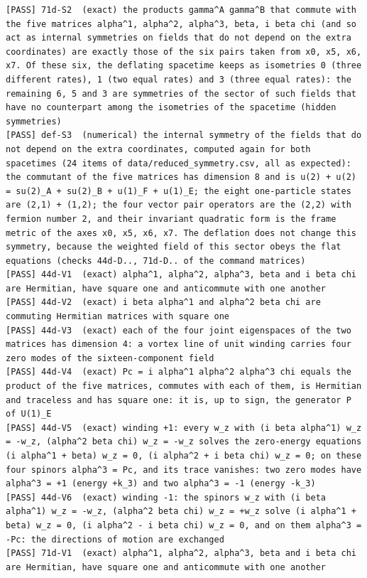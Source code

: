 \documentclass[
  10pt,
]{article}
\begin{document}
\begin{verbatim}
[PASS] 71d-S2  (exact) the products gamma^A gamma^B that commute with the five matrices alpha^1, alpha^2, alpha^3, beta, i beta chi (and so act as internal symmetries on fields that do not depend on the extra coordinates) are exactly those of the six pairs taken from x0, x5, x6, x7. Of these six, the deflating spacetime keeps as isometries 0 (three different rates), 1 (two equal rates) and 3 (three equal rates): the remaining 6, 5 and 3 are symmetries of the sector of such fields that have no counterpart among the isometries of the spacetime (hidden symmetries)
[PASS] def-S3  (numerical) the internal symmetry of the fields that do not depend on the extra coordinates, computed again for both spacetimes (24 items of data/reduced_symmetry.csv, all as expected): the commutant of the five matrices has dimension 8 and is u(2) + u(2) = su(2)_A + su(2)_B + u(1)_F + u(1)_E; the eight one-particle states are (2,1) + (1,2); the four vector pair operators are the (2,2) with fermion number 2, and their invariant quadratic form is the frame metric of the axes x0, x5, x6, x7. The deflation does not change this symmetry, because the weighted field of this sector obeys the flat equations (checks 44d-D.., 71d-D.. of the command matrices)
[PASS] 44d-V1  (exact) alpha^1, alpha^2, alpha^3, beta and i beta chi are Hermitian, have square one and anticommute with one another
[PASS] 44d-V2  (exact) i beta alpha^1 and alpha^2 beta chi are commuting Hermitian matrices with square one
[PASS] 44d-V3  (exact) each of the four joint eigenspaces of the two matrices has dimension 4: a vortex line of unit winding carries four zero modes of the sixteen-component field
[PASS] 44d-V4  (exact) Pc = i alpha^1 alpha^2 alpha^3 chi equals the product of the five matrices, commutes with each of them, is Hermitian and traceless and has square one: it is, up to sign, the generator P of U(1)_E
[PASS] 44d-V5  (exact) winding +1: every w_z with (i beta alpha^1) w_z = -w_z, (alpha^2 beta chi) w_z = -w_z solves the zero-energy equations (i alpha^1 + beta) w_z = 0, (i alpha^2 + i beta chi) w_z = 0; on these four spinors alpha^3 = Pc, and its trace vanishes: two zero modes have alpha^3 = +1 (energy +k_3) and two alpha^3 = -1 (energy -k_3)
[PASS] 44d-V6  (exact) winding -1: the spinors w_z with (i beta alpha^1) w_z = -w_z, (alpha^2 beta chi) w_z = +w_z solve (i alpha^1 + beta) w_z = 0, (i alpha^2 - i beta chi) w_z = 0, and on them alpha^3 = -Pc: the directions of motion are exchanged
[PASS] 71d-V1  (exact) alpha^1, alpha^2, alpha^3, beta and i beta chi are Hermitian, have square one and anticommute with one another

\end{verbatim}
\end{document}
